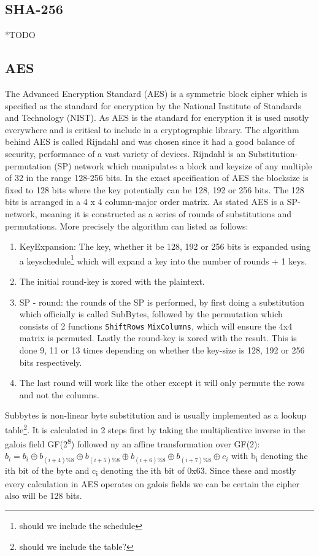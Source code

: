 \documentclass[a4paper]{article}
\begin{document}
\subsection{SHA-256}
\label{SHAalg}
*TODO
\subsection{AES}
\label{AESalg}
The Advanced Encryption Standard (AES) is a symmetric block cipher which is specified as the standard for encryption by the National Institute of Standards and Technology (NIST). As AES is the standard for encryption it is used msotly everywhere and is critical to include in a cryptographic library. The algorithm behind AES is called Rijndahl and was chosen since it had a good balance of security, performance of a vast variety of devices\cite{AESofficial}. Rijndahl is an Substitution-permutation (SP) network which manipulates a block and keysize of any multiple of 32 in the range 128-256 bits. In the exact specification of AES the blocksize is fixed to 128 bits where the key potentially can be 128, 192 or 256 bits. The 128 bits is arranged in a 4 x 4 column-major order matrix. As stated AES is a SP-network, meaning it is constructed as a series of rounds of substitutions and permutations. More precisely the algorithm can listed as follows:
\begin{enumerate}
\item KeyExpansion: The key, whether it be 128, 192 or 256 bits is expanded using a keyschedule\footnote{should we include the schedule} which will expand a key into the number of rounds + 1 keys.
\item The initial round-key is xored with the plaintext.
\item SP - round: the rounds of the SP is performed, by first doing a substitution which officially is called SubBytes\cite{Rijndahl}, followed by the permutation which consists of 2 functions \texttt{ShiftRows} \texttt{MixColumns}, which will ensure the 4x4 matrix is permuted. Lastly the round-key is xored with the result. This is done 9, 11 or 13 times depending on whether the key-size is 128, 192 or 256 bits respectively.
\item The last round will work like the other except it will only permute the rows and not the columns.
\end{enumerate}

Subbytes is non-linear byte substitution and is usually implemented as a lookup table\footnote{should we include the table?}. It is calculated in 2 steps first by taking the multiplicative inverse in the galois field GF(2\textsuperscript{8}) followed ny an affine transformation over GF(2):
\(b_i = b_i \oplus b_{(i+4) \% 8} \oplus b_{(i+5) \% 8} \oplus b_{(i+6) \% 8} \oplus b_{(i+7) \% 8} \oplus c_i\) with b\textsubscript{i} denoting the ith bit of the byte and c\textsubscript{i} denoting the ith bit of 0x63. Since these and mostly every calculation in AES operates on galois fields we can be certain the cipher also will be 128 bits.
\end{document}
